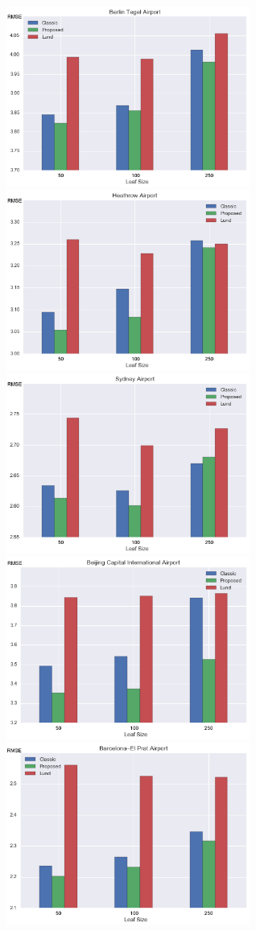 \documentclass[times,twocolumn,final,authoryear]{elsarticle}
\begin{document}
\begin{figure}
  \includegraphics[width=8cm]{berlin.png}
  \includegraphics[width=8cm]{heathrow.png}
  \includegraphics[width=8cm]{sydney.png}
  \includegraphics[width=8cm]{beijing.png}
  \includegraphics[width=8cm]{barcelona.png}

\end{figure}
\end{document}
